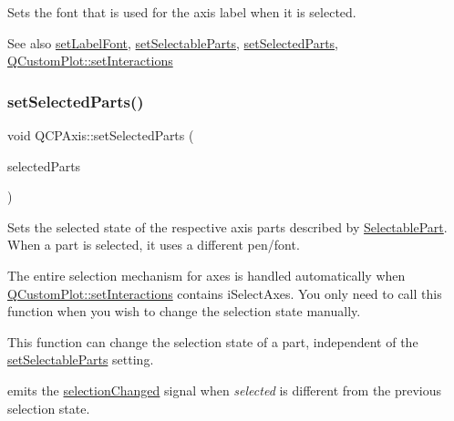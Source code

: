 Sets the font that is used for the axis label when it is selected.

\begin{DoxySeeAlso}{See also}
\hyperlink{class_q_c_p_axis_a71ac1a47f7547e490a8c4311d1433cf3}{set\+Label\+Font}, \hyperlink{class_q_c_p_axis_a513f9b9e326c505d9bec54880031b085}{set\+Selectable\+Parts}, \hyperlink{class_q_c_p_axis_ab9d7a69277dcbed9119b3c1f25ca19c3}{set\+Selected\+Parts}, \hyperlink{class_q_custom_plot_a5ee1e2f6ae27419deca53e75907c27e5}{Q\+Custom\+Plot\+::set\+Interactions} 
\end{DoxySeeAlso}
\mbox{\label{class_q_c_p_axis_ab9d7a69277dcbed9119b3c1f25ca19c3}} 
\subsubsection{\texorpdfstring{set\+Selected\+Parts()}{setSelectedParts()}}
{\footnotesize\ttfamily void Q\+C\+P\+Axis\+::set\+Selected\+Parts (\begin{DoxyParamCaption}\item[{const Q\+C\+P\+Axis\+::\+Selectable\+Parts \&}]{selected\+Parts }\end{DoxyParamCaption})}

Sets the selected state of the respective axis parts described by \hyperlink{class_q_c_p_axis_abee4c7a54c468b1385dfce2c898b115f}{Selectable\+Part}. When a part is selected, it uses a different pen/font.

The entire selection mechanism for axes is handled automatically when \hyperlink{class_q_custom_plot_a5ee1e2f6ae27419deca53e75907c27e5}{Q\+Custom\+Plot\+::set\+Interactions} contains i\+Select\+Axes. You only need to call this function when you wish to change the selection state manually.

This function can change the selection state of a part, independent of the \hyperlink{class_q_c_p_axis_a513f9b9e326c505d9bec54880031b085}{set\+Selectable\+Parts} setting.

emits the \hyperlink{class_q_c_p_axis_a62b598abeee7174a05f9d542cc85b1f5}{selection\+Changed} signal when {\itshape selected} is different from the previous selection state.

